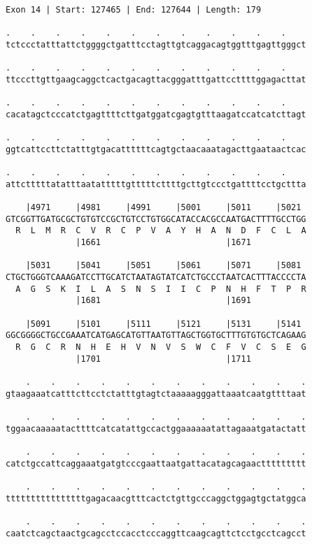 \documentclass{article}
\begin{document}
\newpage
\begin{Verbatim}
Exon 14 | Start: 127465 | End: 127644 | Length: 179
 
.    .    .    .    .    .    .    .    .    .    .    .    
tctccctatttattctggggctgatttcctagttgtcaggacagtggtttgagttgggct
  
.    .    .    .    .    .    .    .    .    .    .    .    
ttcccttgttgaagcaggctcactgacagttacgggatttgattccttttggagacttat
  
.    .    .    .    .    .    .    .    .    .    .    .    
cacatagctcccatctgagttttcttgatggatcgagtgtttaagatccatcatcttagt
  
.    .    .    .    .    .    .    .    .    .    .    .    
ggtcattccttctatttgtgacattttttcagtgctaacaaatagacttgaataactcac
  
.    .    .    .    .    .    .    .    .    .    .    .    
attctttttatatttaatatttttgtttttcttttgcttgtccctgattttcctgcttta
  
    |4971     |4981     |4991     |5001     |5011     |5021 
GTCGGTTGATGCGCTGTGTCCGCTGTCCTGTGGCATACCACGCCAATGACTTTTGCCTGG
  R  L  M  R  C  V  R  C  P  V  A  Y  H  A  N  D  F  C  L  A
              |1661                         |1671           
  
    |5031     |5041     |5051     |5061     |5071     |5081 
CTGCTGGGTCAAAGATCCTTGCATCTAATAGTATCATCTGCCCTAATCACTTTACCCCTA
  A  G  S  K  I  L  A  S  N  S  I  I  C  P  N  H  F  T  P  R
              |1681                         |1691           
  
    |5091     |5101     |5111     |5121     |5131     |5141 
GGCGGGGCTGCCGAAATCATGAGCATGTTAATGTTAGCTGGTGCTTTGTGTGCTCAGAAG
  R  G  C  R  N  H  E  H  V  N  V  S  W  C  F  V  C  S  E  G
              |1701                         |1711           
  
    .    .    .    .    .    .    .    .    .    .    .    .
gtaagaaatcatttcttcctctatttgtagtctaaaaagggattaaatcaatgttttaat
  
    .    .    .    .    .    .    .    .    .    .    .    .
tggaacaaaaatacttttcatcatattgccactggaaaaaatattagaaatgatactatt
  
    .    .    .    .    .    .    .    .    .    .    .    .
catctgccattcaggaaatgatgtcccgaattaatgattacatagcagaacttttttttt
  
    .    .    .    .    .    .    .    .    .    .    .    .
ttttttttttttttttgagacaacgtttcactctgttgcccaggctggagtgctatggca
  
    .    .    .    .    .    .    .    .    .    .    .    .
caatctcagctaactgcagcctccacctcccaggttcaagcagttctcctgcctcagcct
\end{Verbatim}
\end{document}

